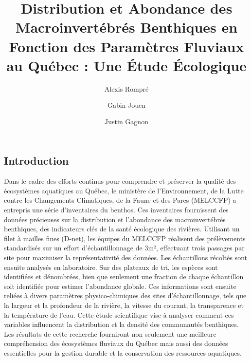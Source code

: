 \documentclass[9pt,twocolumn,twoside,]{pnas-new}
\title{Distribution et Abondance des Macroinvertébrés Benthiques en
Fonction des Paramètres Fluviaux au Québec : Une Étude Écologique}
\author[a,1,2]{Alexis Rompré}
\author[a,b]{Gabin Jouen}
\author[b,1,2]{Justin Gagnon}
\affil[a]{Université de Sherbrooke, Department de Biologie, Bd de
l'Université, Sherbrooke, Québec, J1K 2R1}
\begin{document}
\verticaladjustment{-2pt}



\maketitle
\thispagestyle{firststyle}



\hypertarget{Introduction}{%
\subsection*{Introduction}\label{Introduction}}

Dans le cadre des efforts continus pour comprendre et préserver la
qualité des écosystèmes aquatiques au Québec, le ministère de
l'Environnement, de la Lutte contre les Changements Climatiques, de la
Faune et des Parcs (MELCCFP) a entrepris une série d'inventaires du
benthos. Ces inventaires fournissent des données précieuses sur la
distribution et l'abondance des macroinvertébrés benthiques, des
indicateurs clés de la santé écologique des rivières. Utilisant un filet
à mailles fines (D-net), les équipes du MELCCFP réalisent des
prélèvements standardisés sur un effort d'échantillonnage de 3m²,
effectuant trois passages par site pour maximiser la représentativité
des données. Les échantillons récoltés sont ensuite analysés en
laboratoire. Sur des plateaux de tri, les espèces sont identifiées et
dénombrées, bien que seulement une fraction de chaque échantillon soit
identifiée pour estimer l'abondance globale. Ces informations sont
ensuite reliées à divers paramètres physico-chimiques des sites
d'échantillonnage, tels que la largeur et la profondeur de la rivière,
la vitesse du courant, la transparence et la température de l'eau. Cette
étude scientifique vise à analyser comment ces variables influencent la
distribution et la densité des communautés benthiques. Les résultats de
cette recherche fourniront non seulement une meilleure compréhension des
écosystèmes fluviaux du Québec mais aussi des données essentielles pour
la gestion durable et la conservation des ressources aquatiques.
\end{document}
